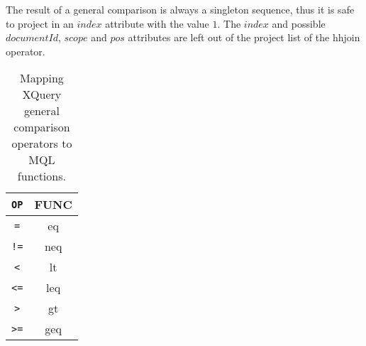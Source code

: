 The result of a general comparison is always a singleton sequence, thus it is safe to project in an $index$
attribute with the value $1$. The $index$ and possible $documentId$, $scope$ and $pos$ attributes are left out of
the project list of the \textsf{hhjoin} operator.

\begin{table}[h]
\centering
\begin{tabular}{c|c}
\texttt{OP} & \textsf{FUNC} \\ \hline
\texttt{=} & \textsf{eq} \\
\texttt{!=} & \textsf{neq} \\
\texttt{<} & \textsf{lt} \\
\texttt{<=} & \textsf{leq} \\
\texttt{>} & \textsf{gt} \\
\texttt{>=} & \textsf{geq} \\
\end{tabular}
\label{tab:trans:TD:genCompMap}
\caption{Mapping XQuery general comparison operators to MQL functions.}
\end{table}

